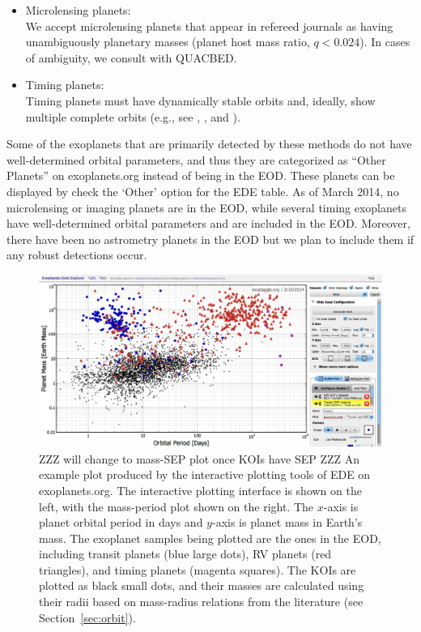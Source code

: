 \documentclass[11pt,preprint]{aastex}
\begin{document}
\begin{CJK*}{UTF8}{gbsn}
\begin{itemize}
\begin{enumerate}
\end{enumerate}
\item Microlensing planets:\\
  We accept microlensing planets that appear in refereed journals as
  having unambiguously planetary masses (planet host mass ratio,
  $q<0.024$). In cases of ambiguity, we consult with QUACBED.  

\item Timing planets:\\
  Timing planets must have dynamically stable orbits and, ideally, show
  multiple complete orbits (e.g., see \citealt{Wittenmyer2012},
  \citealt{Horner2012}, and \citealt{Wittenmyer2013}). 

\end{itemize}
Some of the exoplanets that are primarily detected by these methods do
not have well-determined orbital parameters, and thus they are
categorized as ``Other Planets'' on exoplanets.org instead of being in
the EOD. These planets can be displayed by check the `Other' option
for the EDE table. As of March 2014, no microlensing or imaging
planets are in the EOD, while several timing exoplanets have
well-determined orbital parameters and are included in the
EOD. Moreover, there have been no astrometry planets in the EOD but we
plan to include them if any robust detections occur.


\begin{figure}[!htb]
\centering
\includegraphics[width=\textwidth]{../fig/mass-per-interactive.eps}
\caption{ZZZ will change to mass-SEP plot once KOIs have SEP ZZZ
  An example plot produced by the interactive plotting tools of
  EDE on exoplanets.org. The interactive plotting interface is shown
  on the left, with the mass-period plot shown on the right. The
  $x$-axis is planet orbital period in days and $y$-axis is planet
  mass in Earth's mass. The exoplanet samples being plotted are the
  ones in the EOD, including transit planets (blue large dots), RV
  planets (red triangles), and timing planets (magenta squares). The
  KOIs are plotted as black small dots, and their masses are
  calculated using their radii based on mass-radius relations from the
  literature (see Section~\ref{sec:orbit}).}
\label{fig:koi}
\end{figure}


\end{CJK*}
\end{document}
